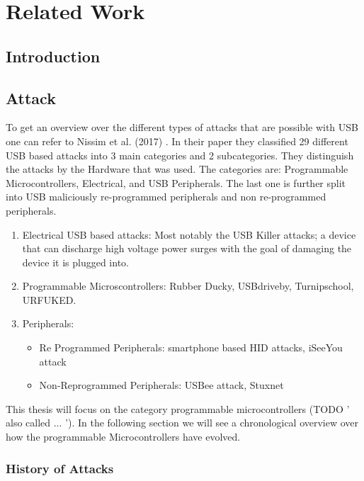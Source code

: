 \chapter{Related Work}

\section{Introduction}

\section{Attack}

To get an overview over the different types of attacks that are possible with USB one can refer to Nissim et al. (2017) \cite{nissimUSBbasedAttacks2017}. In their paper they classified 29 different USB based attacks into 3 main categories and 2 subcategories. They distinguish the attacks by the Hardware that was used. The categories are: Programmable Microcontrollers, Electrical, and USB Peripherals. The last one is further split into USB maliciously re-programmed peripherals and non re-programmed peripherals. 

\begin{enumerate}
  \item Electrical USB based attacks: Most notably the USB Killer attacks; a device that can discharge high voltage power surges with the goal of damaging the device it is plugged into. \cite{USBKillDevices}
  \item Programmable Microscontrollers: Rubber Ducky, USBdriveby, Turnipschool, URFUKED.
  \item Peripherals:
  \begin{itemize}
      \item Re Programmed Peripherals: smartphone based HID attacks, iSeeYou attack
      \item Non-Reprogrammed Peripherals: USBee attack, Stuxnet
  \end{itemize}
\end{enumerate}
	


This thesis will focus on the category programmable microcontrollers (TODO ' also called ... '). In the following section we will see a chronological overview over how the programmable Microcontrollers have evolved.  

\subsection{History of Attacks}

